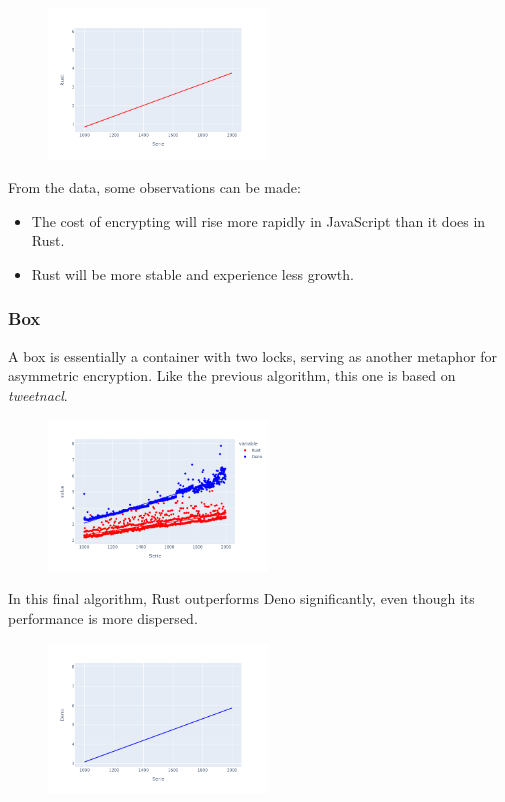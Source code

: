 \documentclass[12pt, letterpaper]{article}
\begin{document}
\begin{multicols}{2}
    \begin{figure}[H]
        \centering
        \includegraphics[width=0.52\textwidth]{images/trend_secretbox_rust}
    \end{figure}

    From the data, some observations can be made:
    \begin{itemize}
        \item The cost of encrypting will rise more rapidly in JavaScript than it does in Rust.
        \item Rust will be more stable and experience less growth.
    \end{itemize}


    \subsubsection{Box}

    A box is essentially a container with two locks, serving as another metaphor for asymmetric encryption. Like the previous algorithm, this one is based on \textit{tweetnacl}.

    \begin{figure}[H]
        \centering
        \includegraphics[width=0.52\textwidth]{images/box_lines}
    \end{figure}

    In this final algorithm, Rust outperforms Deno significantly, even though its performance is more dispersed.

    \begin{figure}[H]
        \centering
        \includegraphics[width=0.52\textwidth]{trend_box_deno}
    \end{figure}


\end{multicols}
\end{document}
